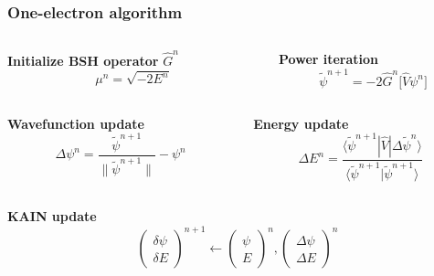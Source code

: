 \documentclass[mathserif, 10pt]{beamer}
\begin{document}
\begin{frame}
    \frametitle{One-electron algorithm}

    \begin{columns}
    \begin{column}{.50\textwidth}
    \centering
    \textbf{Initialize BSH operator} $\hat{G}^n$
    \begin{equation}
        \nonumber
        \mu^n = \sqrt{-2E^n}
    \end{equation}
    \end{column}

    \begin{column}{.50\textwidth}
    \centering
    \textbf{Power iteration}
    \begin{equation}
	\nonumber
	\tilde{\psi}^{n+1} = -2\hat{G}^n \Big[ \hat{V} \psi^n \Big]
    \end{equation}
    \end{column}
    \end{columns}

    \vspace{5mm}

    \begin{columns}
    \begin{column}{.50\textwidth}
    \centering
    \textbf{Wavefunction update}
    \begin{equation}
	\nonumber
	\Delta\psi^n = \frac{\tilde{\psi}^{n+1}}{\|\tilde{\psi}^{n+1}\|} - \psi^n
    \end{equation}
    \end{column}

    \begin{column}{.50\textwidth}
    \centering
    \textbf{Energy update}
    \begin{equation}
	\nonumber
	\Delta E^n =
        \frac{\langle\tilde{\psi}^{n+1}|\hat{V}|\Delta\tilde{\psi}^n\rangle}
        {\langle\tilde{\psi}^{n+1}|\tilde{\psi}^{n+1}\rangle}
    \end{equation}
    \end{column}
    \end{columns}

    \vspace{5mm}

    \centering
    \textbf{KAIN update}
    \begin{equation}
	\nonumber
        \left(
        \begin{matrix}
        \delta \psi\\
        \delta E
        \end{matrix}
        \right)^{n+1}
        \longleftarrow
        \left(
        \begin{matrix}
        \psi\\
        E
        \end{matrix}
        \right)^n
        ,
        \left(
        \begin{matrix}
        \Delta \psi\\
        \Delta E
        \end{matrix}
        \right)^n
    \end{equation}


\end{frame}
\end{document}
